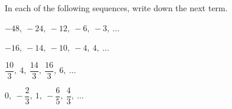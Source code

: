  In each of the following sequences, write down the next term.

\begin{subparts}
  \item $-48,\ -24,\ -12,\ -6,\ -3,\ \ldots$
  \item $-16,\ -14,\ -10,\ -4,\ 4,\ \ldots$
  \item $\dfrac{10}{3},\ 4,\ \dfrac{14}{3},\ \dfrac{16}{3},\ 6,\ \ldots$
  \item $0,\ -\dfrac{2}{3},\ 1,\ -\dfrac{6}{5},\ \dfrac{4}{3},\ \ldots$
\end{subparts}

